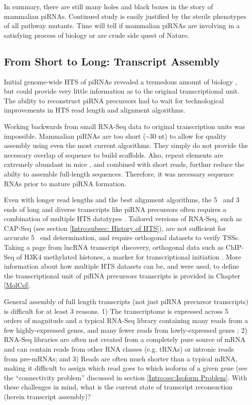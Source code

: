 {    In summary, there are still many holes and black boxes in the story of mammalian piRNAs. Continued study is easily justified by the sterile phenotypes of all pathway mutants. Time will tell if mammalian piRNAs are involving in a satisfying process of biology or are crude side quest of Nature.


  \subsection{From Short to Long: Transcript Assembly}
    \label{Intro:subsec:Tx Assembly}

    Initial genome-wide HTS of piRNAs revealed a tremedous amount of biology \citep{Gunawardane2007,Brennecke2007}, but could provide very little information as to the original transcriptional unit. The ability to reconstruct piRNA precursors had to wait for technological improvements in HTS read length and alignment algorithms.

    Working backwards from small RNA-Seq data to original transcription units was impossible. Mammalian piRNAs are too short (\textasciitilde30 nt) to allow for quality assembly using even the most current algorithms. They simply do not provide the necessary overlap of sequence to build scaffolds. Also, repeat elements are extremely abundant in mice \citep{Nellaker2012}, and combined with short reads, furthur reduce the abilty to assemble full-length sequences. Therefore, it was necessary sequence RNAs prior to mature piRNA formation.

    Even with longer read lengths and the best alignment algorithms, the 5\textprime~ and 3\textprime~ ends of long and diverse transcripts like piRNA precursors often requires a combination of multiple HTS datatypes \citep{Blower2013}. Tailored versions of RNA-Seq, such as CAP-Seq (see section \ref{Intro:subsec: History of HTS}), are not sufficient for accurate 5\textprime~ end determination, and require orthogonal datasets to verify TSSs. Taking a page from lncRNA transcript discovery, orthogonal data such as ChIP-Seq of H3K4 methylated histones, a marker for transcriptional initiation \citep{Khalil2009}. More information about how multiple HTS datasets can be, and were used, to define the transcriptional unit of piRNA precursors transcripts is provided in Chapter \ref{MolCel}.

    General assembly of full length transcripts (not just piRNA precursor transcripts) is difficult for at least 3 reasons. 1) The transcriptome is expressed across 5 orders of magnitude and a typical RNA-Seq library containing many reads from a few highly-expressed genes, and many fewer reads from lowly-expressed genes \citep{Blencowe2009}; 2) RNA-Seq libraries are often not created from a completely pure source of mRNA and can contain reads from other RNA classes (e.g. tRNAs) or intronic reads from pre-mRNAs; and 3) Reads are often much shorter than a typical mRNA, making it difficult to assign which read goes to which isoform of a given gene (see the ``connectivity problem'' discussed in section \ref{Intro:sec:Isoform Problem}. With these challenges in mind, what is the current state of transcript reconsuction (herein transcript assembly)?

}
